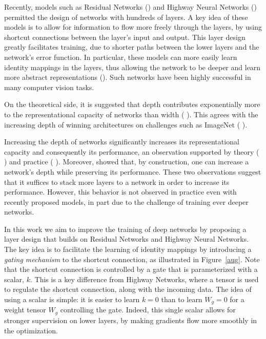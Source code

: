 \documentclass{article} \RequirePackage{amsmath,amsthm,amsfonts,amssymb}
\begin{document}
Recently, models such as Residual Networks (\cite{resnet1}) and Highway Neural Networks (\cite{highway}) permitted the design of networks with hundreds of layers. A key idea of these models is to allow for information to flow more freely through the layers, by using shortcut connections between the layer's input and output. This layer design greatly facilitates training, due to shorter paths between the lower layers and the network's error function. In particular, these models can more easily learn identity mappings in the layers, thus allowing the network to be deeper and learn more abstract representations (\cite{representations}). Such networks have been highly successful in many computer vision tasks. 

On the theoretical side, it is suggested that depth contributes exponentially more to the representational capacity of networks than width (\cite{exp1} \cite{exp2} \cite{exp3} \cite{exp4}). This agrees with the increasing depth of winning architectures on challenges such as ImageNet (\cite{resnet1} \cite{googlenet}). 


Increasing the depth of networks significantly increases its representational capacity and consequently its performance, an observation supported by theory (\cite{exp1} \cite{exp2} \cite{exp3} \cite{exp4}) and practice (\cite{resnet1} \cite{googlenet}). Moreover, \cite{resnet1} showed that, by construction, one can increase a network's depth while preserving its performance. These two observations suggest that it suffices to stack more layers to a network in order to increase its performance. However, this behavior is not observed in practice even with recently proposed models, in part due to the challenge of training ever deeper networks. 


In this work we aim to improve the training of deep networks by proposing a layer design that builds on Residual Networks and Highway Neural Networks. The key idea is to facilitate the learning of identity mappings by introducing a {\em gating mechanism} to the shortcut connection, as illustrated in Figure~\ref{aug}. Note that the shortcut connection is controlled by a gate that is parameterized with a scalar, $k$. This is a key difference from Highway Networks, where a tensor is used to regulate the shortcut connection, along with the incoming data. The idea of using a scalar is simple: it is easier to learn $k=0$ than to learn $W_g=0$ for a weight tensor $W_g$ controlling the gate. Indeed, this single scalar allows for stronger supervision on lower layers, by making gradients flow more smoothly in the optimization.
\end{document}

